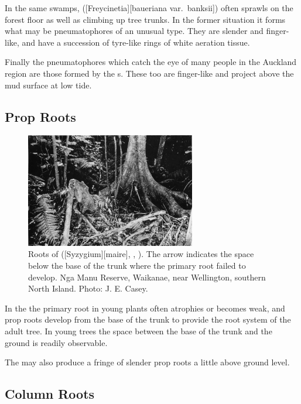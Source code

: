 In the same swamps,  ([Freycinetia][baueriana var.\ banksii]) often sprawls on the forest floor as well as climbing up tree trunks.
In the former situation it forms what may be pneumatophores of an unusual type.
They are slender and finger-like, and have a succession of tyre-like rings of white aeration tissue.

Finally the pneumatophores which catch the eye of many people in the Auckland region are those formed by the s.
These too are finger-like and project above the mud surface at low tide.

\subsection{Prop Roots}

\begin{figure}
	\includegraphics[width=0.66\textwidth]{graphics/fig_014}
	\centering
	\caption[Roots of swamp maire]{Roots of  ([Syzygium][maire], , ).
	The arrow indicates the space below the base of the trunk where the primary root failed to develop.
	Nga Manu Reserve, Waikanae, near Wellington, southern North Island.
	Photo:  J. E. Casey.}%
	\label{fig:14swampmaire}
\end{figure}

In the  the primary root in young plants often atrophies or becomes weak, and prop roots develop from the base of the trunk to provide the root system of the adult tree.
In young trees the space between the base of the trunk and the ground is readily observable.

The  may also produce a fringe of slender prop roots a little above ground level.

\subsection{Column Roots}

